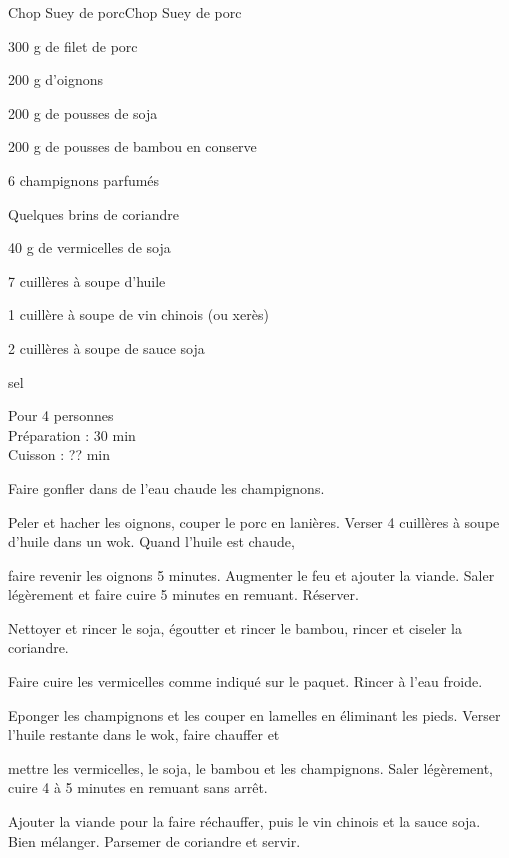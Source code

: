 \begin{recette}{Chop Suey de porc}{Chop Suey de porc}

\begin{ingredients}
300 g de filet de porc\par
200 g d'oignons\par
200 g de pousses de soja\par
200 g de pousses de bambou en conserve\par
6 champignons parfumés\par
Quelques brins de coriandre\par
40 g de vermicelles de soja\par
7 cuillères à soupe d'huile\par
1 cuillère à soupe de vin chinois (ou xerès)\par
2 cuillères à soupe de sauce soja\par
sel\par
\end{ingredients}

\begin{infos}
Pour 4 personnes\\
Préparation : 30 min\\
Cuisson : ?? min\\
\end{infos}

\begin{etapes}
\item Faire gonfler dans de l'eau chaude les champignons.
\item Peler et hacher les oignons, couper le porc en lanières. Verser 4 cuillères à soupe d'huile dans un wok. Quand l'huile est chaude,
\item faire revenir les oignons 5 minutes. Augmenter le feu et ajouter la viande. Saler légèrement et faire cuire 5 minutes en remuant. Réserver.
\item Nettoyer et rincer le soja, égoutter et rincer le bambou, rincer et ciseler la coriandre.
\item Faire cuire les vermicelles comme indiqué sur le paquet. Rincer à l'eau froide.
\item Eponger les champignons et les couper en lamelles en éliminant les pieds. Verser l'huile restante dans le wok, faire chauffer et
\item mettre les vermicelles, le soja, le bambou et les champignons. Saler légèrement, cuire 4 à 5 minutes en remuant sans arrêt.
\item Ajouter la viande pour la faire réchauffer, puis le vin chinois et la sauce soja. Bien mélanger. Parsemer de coriandre et servir.
\end{etapes}

\end{recette}